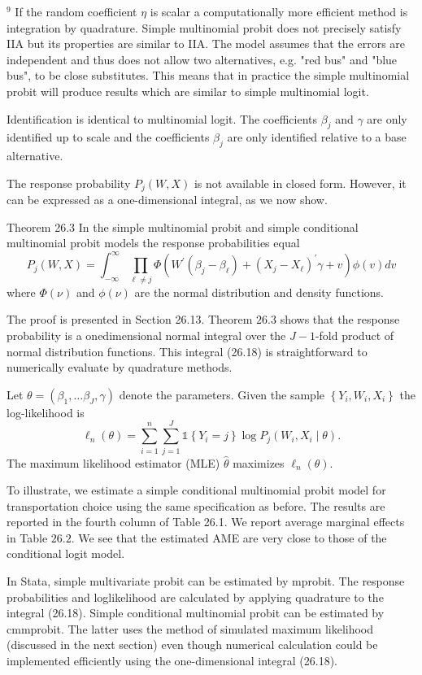 \documentclass[10pt]{article}
\begin{document}
${ }^{9}$ If the random coefficient $\eta$ is scalar a computationally more efficient method is integration by quadrature. Simple multinomial probit does not precisely satisfy IIA but its properties are similar to IIA. The model assumes that the errors are independent and thus does not allow two alternatives, e.g. "red bus" and "blue bus", to be close substitutes. This means that in practice the simple multinomial probit will produce results which are similar to simple multinomial logit.

Identification is identical to multinomial logit. The coefficients $\beta_{j}$ and $\gamma$ are only identified up to scale and the coefficients $\beta_{j}$ are only identified relative to a base alternative.

The response probability $P_{j}(W, X)$ is not available in closed form. However, it can be expressed as a one-dimensional integral, as we now show.

Theorem 26.3 In the simple multinomial probit and simple conditional multinomial probit models the response probabilities equal
$$
P_{j}(W, X)=\int_{-\infty}^{\infty} \prod_{\ell \neq j} \Phi\left(W^{\prime}\left(\beta_{j}-\beta_{\ell}\right)+\left(X_{j}-X_{\ell}\right)^{\prime} \gamma+v\right) \phi(v) d v
$$
where $\Phi(\nu)$ and $\phi(\nu)$ are the normal distribution and density functions.

The proof is presented in Section 26.13. Theorem $26.3$ shows that the response probability is a onedimensional normal integral over the $J-1$-fold product of normal distribution functions. This integral (26.18) is straightforward to numerically evaluate by quadrature methods.

Let $\theta=\left(\beta_{1}, \ldots \beta_{J}, \gamma\right)$ denote the parameters. Given the sample $\left\{Y_{i}, W_{i}, X_{i}\right\}$ the log-likelihood is
$$
\ell_{n}(\theta)=\sum_{i=1}^{n} \sum_{j=1}^{J} \mathbb{1}\left\{Y_{i}=j\right\} \log P_{j}\left(W_{i}, X_{i} \mid \theta\right) .
$$
The maximum likelihood estimator (MLE) $\widehat{\theta}$ maximizes $\ell_{n}(\theta)$.

To illustrate, we estimate a simple conditional multinomial probit model for transportation choice using the same specification as before. The results are reported in the fourth column of Table 26.1. We report average marginal effects in Table $26.2$. We see that the estimated AME are very close to those of the conditional logit model.

In Stata, simple multivariate probit can be estimated by mprobit. The response probabilities and loglikelihood are calculated by applying quadrature to the integral (26.18). Simple conditional multinomial probit can be estimated by cmmprobit. The latter uses the method of simulated maximum likelihood (discussed in the next section) even though numerical calculation could be implemented efficiently using the one-dimensional integral (26.18).
\end{document}
